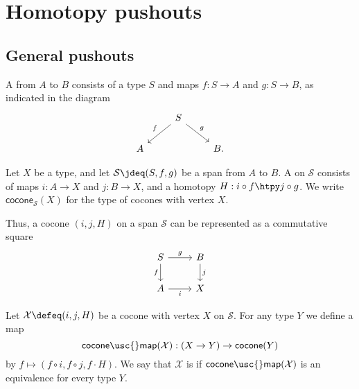 \chapter{Homotopy pushouts}

\section{General pushouts}

\begin{defn}
A  from $A$ to $B$ consists of a type $S$ and maps $f:S\to A$ and $g:S\to B$, as indicated in the diagram
\begin{equation*}
\begin{tikzcd}
& S \arrow[dl,swap,"f"] \arrow[dr,"g"] \\
A & & B.
\end{tikzcd}
\end{equation*}
\end{defn}

\begin{defn}
Let $X$ be a type, and let $\mathcal{S}\jdeq (S,f,g)$ be a span from $A$ to $B$.
A  on $\mathcal{S}$ consists of maps $i:A\to X$ and $j:B\to X$, and a homotopy $H:i\circ f\htpy j\circ g$.
We write $\mathsf{cocone}_{\mathcal{S}}(X)$ for the type of cocones with vertex $X$.
\end{defn}

Thus, a cocone $(i,j,H)$ on a span $\mathcal{S}$ can be represented as a commutative square
\begin{equation*}
\begin{tikzcd}
S \arrow[r,"g"] \arrow[d,swap,"f"] & B \arrow[d,"j"] \\
A \arrow[r,swap,"i"] & X 
\end{tikzcd}
\end{equation*}

\begin{defn}
Let $\mathcal{X}\defeq(i,j,H)$ be a cocone with vertex $X$ on $\mathcal{S}$. For any type $Y$ we define a map
\begin{equation*}
\mathsf{cocone\usc{}map}(\mathcal{X}):(X\to Y)\to \mathsf{cocone}(Y)
\end{equation*}
by $f\mapsto (f\circ i,f\circ j,f\cdot H)$. We say that $\mathcal{X}$ is  if $\mathsf{cocone\usc{}map}(\mathcal{X})$ is an equivalence for every type $Y$. 
\end{defn}

